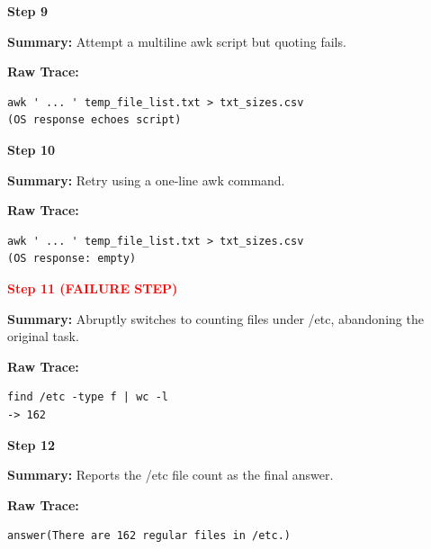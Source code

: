 \documentclass[11pt]{article}
\begin{document}
\begin{tcolorbox}[
breakable,
colback=customwhite,
colframe=customyellow,
title=Catastrophic Forgetting,
fontupper=\fontfamily{pcr}\selectfont\scriptsize
]

\textbf{Step 9}

\textbf{Summary:}  
Attempt a multiline awk script but quoting fails.

\textbf{Raw Trace:}
\begin{verbatim}
awk ' ... ' temp_file_list.txt > txt_sizes.csv
(OS response echoes script)
\end{verbatim}

\medskip
\textbf{Step 10}

\textbf{Summary:}  
Retry using a one-line awk command.

\textbf{Raw Trace:}
\begin{verbatim}
awk ' ... ' temp_file_list.txt > txt_sizes.csv
(OS response: empty)
\end{verbatim}

\medskip
\textbf{\textcolor{red}{Step 11 (FAILURE STEP)}}

\textbf{Summary:}  
Abruptly switches to counting files under /etc, abandoning the original task.

\textbf{Raw Trace:}
\begin{verbatim}
find /etc -type f | wc -l
-> 162
\end{verbatim}

\medskip
\textbf{Step 12}

\textbf{Summary:}  
Reports the /etc file count as the final answer.

\textbf{Raw Trace:}
\begin{verbatim}
answer(There are 162 regular files in /etc.)
\end{verbatim}

\end{tcolorbox}
\end{document}
